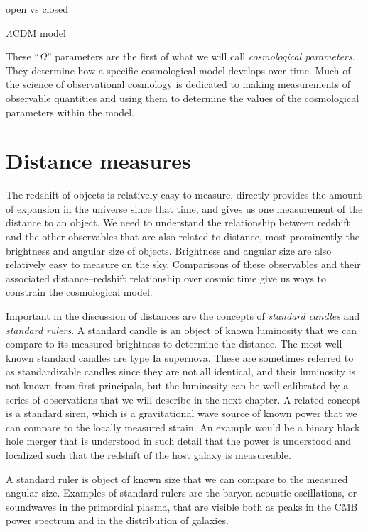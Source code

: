open vs closed

$\Lambda$CDM model


These ``$\Omega$'' parameters are the first of what we will call \textit{cosmological parameters}.  They determine how a specific cosmological model develops over time.  Much of the science of observational cosmology is dedicated to making measurements of observable quantities and using them to determine the values of the cosmological parameters within the model.

\section{Distance measures}

The redshift of objects is relatively easy to measure, directly provides the amount of expansion in the universe since that time, and gives us one measurement of the distance to an object.  We need to understand the relationship between redshift and the other observables that are also related to distance, most prominently the brightness and angular size of objects.  Brightness and angular size are also relatively easy to measure on the sky.  Comparisons of these observables and their associated distance--redshift relationship over cosmic time give us ways to constrain the cosmological model.

Important in the discussion of distances are the concepts of \textit{standard candles} and \textit{standard rulers}.  A standard candle is an object of known luminosity that we can compare to its measured brightness to determine the distance.  The most well known standard candles are type Ia supernova.  These are sometimes referred to as standardizable candles since they are not all identical, and their luminosity is not known from first principals, but the luminosity can be well calibrated by a series of observations that we will describe in the next chapter.  A related concept is a standard siren, which is a gravitational wave source of known power that we can compare to the locally measured strain.  An example would be a binary black hole merger that is understood in such detail that the power is understood and localized such that the redshift of the host galaxy is measureable.

A standard ruler is object of known size that we can compare to the measured angular size.  Examples of standard rulers are the baryon acoustic oscillations, or soundwaves in the primordial plasma, that are visible both as peaks in the CMB power spectrum and in the distribution of galaxies.  

